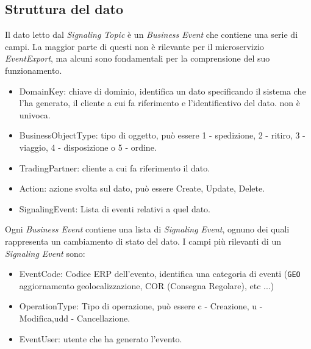 \subsection{Struttura del dato}
\label{subsec:StrutturaDelDato}
Il dato letto dal \textit{Signaling Topic} è un \textit{Business Event} che contiene una serie di campi. 
La maggior parte di questi non è rilevante per il microservizio \textit{EventExport}, ma alcuni sono fondamentali per la comprensione del suo funzionamento.
\begin{itemize}
    \item DomainKey: chiave di dominio, identifica un dato specificando il sistema che l'ha generato, il cliente a cui fa riferimento e l'identificativo del dato. non è univoca.
    \item BusinessObjectType: tipo di oggetto, può essere 1 - spedizione, 2 - ritiro, 3 - viaggio, 4 - disposizione o 5 - ordine.
    \item TradingPartner: cliente a cui fa riferimento il dato.
    \item Action: azione svolta sul dato, può essere Create, Update, Delete.
    \item SignalingEvent: Lista di eventi relativi a quel dato.
\end{itemize}
Ogni \textit{Business Event} contiene una lista di \textit{Signaling Event}, ognuno dei quali rappresenta un cambiamento di stato del dato. I campi più rilevanti di un \textit{Signaling Event} sono:
\begin{itemize}
    \item EventCode: Codice ERP dell'evento, identifica una categoria di eventi (\texttt{GEO} aggiornamento geolocalizzazione, COR (Consegna Regolare), etc ...)
    \item OperationType: Tipo di operazione, può essere c - Creazione, u - Modifica,udd - Cancellazione.
    \item EventUser: utente che ha generato l'evento. 
\end{itemize}

